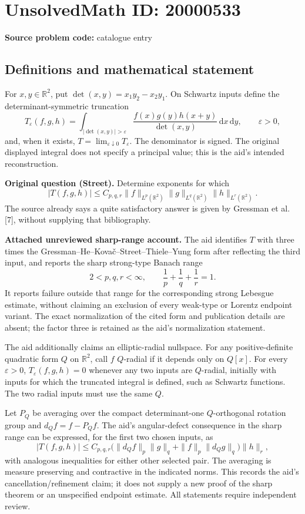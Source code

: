 \documentclass[11pt]{article}
\newcommand{\R}{\mathbb{R}}
\newcommand{\eps}{\varepsilon}
\newcommand{\dd}{\,\mathrm{d}}
\begin{document}
\section*{UnsolvedMath ID: 20000533}
\textbf{Source problem code:} catalogue entry
\subsection{Definitions and mathematical statement}
For $x,y\in\R^2$, put $\det(x,y)=x_1y_2-x_2y_1$. On Schwartz inputs define the determinant-symmetric truncation
\[T_\eps(f,g,h)=\int_{|\det(x,y)|>\eps}\frac{f(x)g(y)h(x+y)}{\det(x,y)}\dd x\dd y,\qquad\eps>0,\]
and, when it exists, $T=\lim_{\eps\downarrow0}T_\eps$. The denominator is signed. The original displayed integral does not specify a principal value; this is the aid's intended reconstruction.

\textbf{Original question (Street).} Determine exponents for which
\[|T(f,g,h)|\le C_{p,q,r}\|f\|_{L^p(\R^2)}\|g\|_{L^q(\R^2)}\|h\|_{L^r(\R^2)}.\]
The source already says a quite satisfactory answer is given by Gressman et al. [7], without supplying that bibliography.

\textbf{Attached unreviewed sharp-range account.} The aid identifies $T$ with three times the Gressman--He--Kovač--Street--Thiele--Yung form after reflecting the third input, and reports the sharp strong-type Banach range
\[2<p,q,r<\infty,\qquad\frac1p+\frac1q+\frac1r=1.\]
It reports failure outside that range for the corresponding strong Lebesgue estimate, without claiming an exclusion of every weak-type or Lorentz endpoint variant. The exact normalization of the cited form and publication details are absent; the factor three is retained as the aid's normalization statement.

The aid additionally claims an elliptic-radial nullspace. For any positive-definite quadratic form $Q$ on $\R^2$, call $f$ $Q$-radial if it depends only on $Q[x]$. For every $\eps>0$, $T_\eps(f,g,h)=0$ whenever any two inputs are $Q$-radial, initially with inputs for which the truncated integral is defined, such as Schwartz functions. The two radial inputs must use the same $Q$.

Let $P_Q$ be averaging over the compact determinant-one $Q$-orthogonal rotation group and $d_Qf=f-P_Qf$. The aid's angular-defect consequence in the sharp range can be expressed, for the first two chosen inputs, as
\[|T(f,g,h)|\le C_{p,q,r}\bigl(\|d_Qf\|_p\|g\|_q+\|f\|_p\|d_Qg\|_q\bigr)\|h\|_r,\]
with analogous inequalities for either other selected pair. The averaging is measure preserving and contractive in the indicated norms. This records the aid's cancellation/refinement claim; it does not supply a new proof of the sharp theorem or an unspecified endpoint estimate. All statements require independent review.
\end{document}
